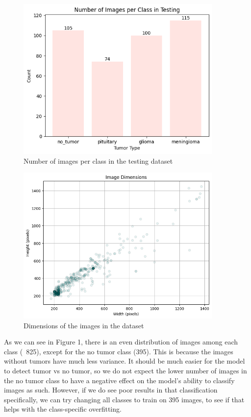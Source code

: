 \documentclass[conference]{IEEEtran}
\begin{document}
\begin{figure}[!ht]
    \centering
    \includegraphics[width=4in]{images/ImagesPerClassTesting.png}
    \caption{Number of images per class in the testing dataset}
    \label{Number of images per class in the testing dataset}
\end{figure}

\begin{figure}[!ht]
    \centering
    \includegraphics[width=4in]{images/ImageDimensions.png}
    \caption{Dimensions of the images in the dataset}
    \label{Dimensions of images in the dataset}
\end{figure}

As we can see in Figure 1, there is an even distribution of images among each class (~825), except for the no tumor class (395). This is because the images without tumors have much less variance. It should be much easier for the model to detect tumor vs no tumor, so we do not expect the lower number of images in the no tumor class to have a negative effect on the model's ability to classify images as such. However, if we do see poor results in that classification specifically, we can try changing all classes to train on 395 images, to see if that helps with the class-specific overfitting.
\end{document}
